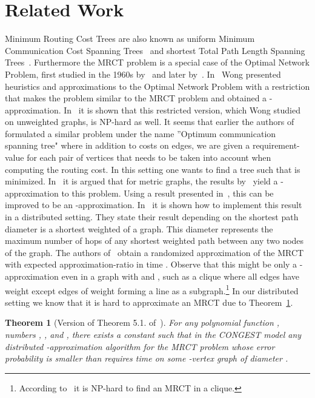 \documentclass[11pt]{article}
\newtheorem{theorem}{Theorem}[section]
\begin{document}
\section{Related Work}\label{sec:related}
Minimum Routing Cost Trees are also known as uniform Minimum Communication Cost Spanning Trees~\cite{peleg2002low,reshef1999approximating} and shortest Total Path Length Spanning Trees~\cite{wu2000approximation}. Furthermore the MRCT problem is a special case of the Optimal Network Problem, first studied in the 1960s by~\cite{scott1969optimal} and later by~\cite{dionne1979exact}. In~\cite{wong1980worst} Wong presented heuristics and approximations to the Optimal Network Problem with a restriction that makes the problem similar to the MRCT problem and obtained a -approximation. In~\cite{johnson1978complexity} it is shown that this restricted version, which Wong studied on unweighted graphs, is NP-hard as well. It seems that earlier the authors of~\cite{hu1974optimum} formulated a similar problem under the name ''Optimum communication spanning tree" where in addition to costs on edges, we are given a requirement-value  for each pair of vertices that needs to be taken into account when computing the routing cost. In this setting one wants to find a tree  such that  is minimized. In~\cite{WuLBCRT99} it is argued that for metric graphs, the results by~\cite{bartal1996probabilistic,bartal1998approximating,charikar1998rounding} yield a -approximation to this problem. Using a result presented in~\cite{fakcharoenphol2003tight}, this can be improved to be an -approximation. In~\cite{khan2008efficient} it is shown how to implement this result in a distributed setting. They state their result depending on the shortest path diameter  is a shortest weighted   of a graph. This diameter represents the maximum number of hops of any shortest weighted path between any two nodes of the graph. The authors of~\cite{khan2008efficient} obtain a randomized approximation of the MRCT with expected approximation-ratio  in time . Observe that this might be only a -approximation even in a graph with  and , such as a clique where all edges have weight  except  edges of weight  forming a line as a subgraph.\footnote{According to~\cite{WuLBCRT99} it is NP-hard to find an MRCT in a clique.} In our distributed setting we know that it is hard to approximate an MRCT due to Theorem~\ref{thm:randomized_approximation}. 
\begin{theorem}[Version of Theorem 5.1. of~\cite{sarma2012distributed}]\label{thm:randomized_approximation}
For any polynomial function , numbers , , and , there exists a constant  such that in the CONGEST model any distributed -approximation algorithm for the MRCT problem whose error probability is smaller than  requires  time on some -vertex graph of diameter .
\end{theorem}
\end{document}
